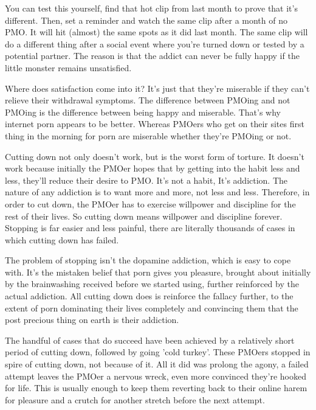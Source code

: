 \documentclass[easypeasy.tex]{subfiles}
\begin{document}
You can test this yourself, find that hot clip from last month to prove that it's different. Then, set a reminder and watch the same clip after a month of no PMO. It will hit (almost) the same spots as it did last month. The same clip will do a different thing after a social event where you're turned down or tested by a potential partner. The reason is that the addict can never be fully happy if the little monster remains unsatisfied.

Where does satisfaction come into it? It's just that they're miserable if they can't relieve their withdrawal symptoms. The difference between PMOing and not PMOing is the difference between being happy and miserable. That's why internet porn appears to be better. Whereas PMOers who get on their sites first thing in the morning for porn are miserable whether they're PMOing or not.

Cutting down not only doesn't work, but is the worst form of torture. It doesn't work because initially the PMOer hopes that by getting into the habit less and less, they'll reduce their desire to PMO. It's not a habit, It's addiction. The nature of any addiction is to want more and more, not less and less. Therefore, in order to cut down, the PMOer has to exercise willpower and discipline for the rest of their lives. So cutting down means willpower and discipline forever. Stopping is far easier and less painful, there are literally thousands of cases in which cutting down has failed.

The problem of stopping isn't the dopamine addiction, which is easy to cope with. It's the mistaken belief that porn gives you pleasure, brought about initially by the brainwashing received before we started using, further reinforced by the actual addiction. All cutting down does is reinforce the fallacy further, to the extent of porn dominating their lives completely and convincing them that the post precious thing on earth is their addiction.

The handful of cases that do succeed have been achieved by a relatively short period of cutting down, followed by going 'cold turkey'. These PMOers stopped in spire of cutting down, not because of it. All it did was prolong the agony, a failed attempt leaves the PMOer a nervous wreck, even more convinced they're hooked for life. This is usually enough to keep them reverting back to their online harem for pleasure and a crutch for another stretch before the next attempt.
\end{document}

